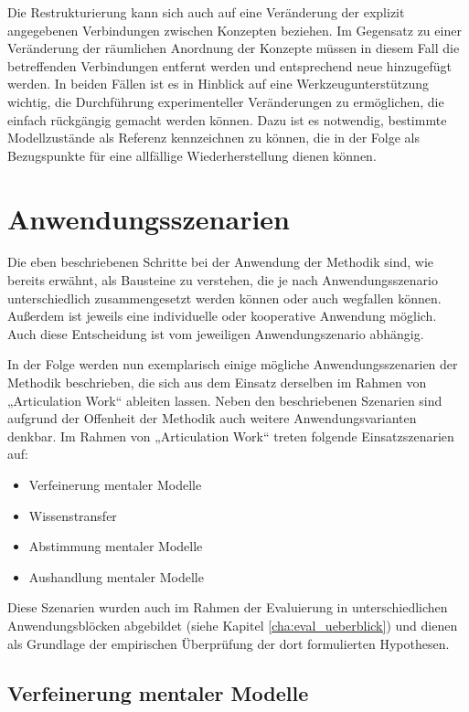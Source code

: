 Die Restrukturierung kann sich auch auf eine Veränderung der explizit angegebenen Verbindungen zwischen Konzepten beziehen. Im Gegensatz zu einer Veränderung der räumlichen Anordnung der Konzepte müssen in diesem Fall die betreffenden Verbindungen entfernt werden und entsprechend neue hinzugefügt werden. In beiden Fällen ist es in Hinblick auf eine Werkzeugunterstützung wichtig, die Durchführung experimenteller Veränderungen zu ermöglichen, die einfach rückgängig gemacht werden können. Dazu ist es notwendig, bestimmte Modellzustände als Referenz kennzeichnen zu können, die in der Folge als Bezugspunkte für eine allfällige Wiederherstellung dienen können.


\section{Anwendungsszenarien}

Die eben beschriebenen Schritte bei der Anwendung der Methodik sind, wie bereits erwähnt, als Bausteine zu verstehen, die je nach Anwendungsszenario unterschiedlich zusammengesetzt werden können oder auch wegfallen können. Außerdem ist jeweils eine individuelle oder kooperative Anwendung möglich. Auch diese Entscheidung ist vom jeweiligen Anwendungszenario abhängig.

In der Folge werden nun exemplarisch einige mögliche Anwendungsszenarien der Methodik beschrieben, die sich aus dem Einsatz derselben im Rahmen von „Articulation Work“ ableiten lassen. Neben den beschriebenen Szenarien sind aufgrund der Offenheit der Methodik auch weitere Anwendungsvarianten denkbar. Im Rahmen von „Articulation Work“ treten folgende Einsatzszenarien auf:

\begin{itemize}
 \item Verfeinerung mentaler Modelle
 \item Wissenstransfer
 \item Abstimmung mentaler Modelle 
 \item Aushandlung mentaler Modelle
\end{itemize}

Diese Szenarien wurden auch im Rahmen der Evaluierung in unterschiedlichen Anwendungsblöcken abgebildet (siehe Kapitel \ref{cha:eval_ueberblick}) und dienen als Grundlage der empirischen Überprüfung der dort formulierten Hypothesen.

\subsection{Verfeinerung mentaler Modelle} %
\label{sub:verfeinerung_individueller_mentaler_modelle}

